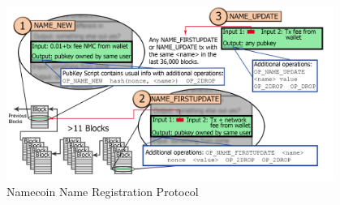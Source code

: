 \begin{figure}
  \centering
  \includegraphics[width=0.95\textwidth]{registration.png}
  \caption{Namecoin Name Registration Protocol}
  \label{fig:registration}
\end{figure}

